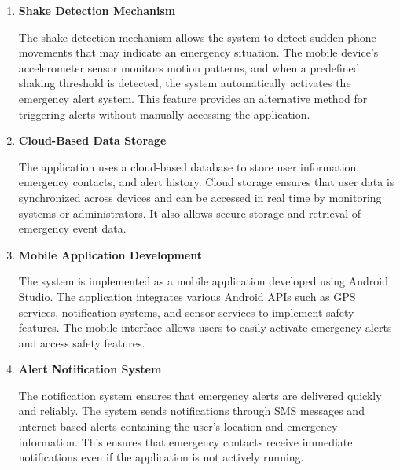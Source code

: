 \documentclass[a4paper,12pt]{report}
\begin{document}
\begin{enumerate}
The system allows users to store and manage emergency contact details within the application. Users can add, update, or remove trusted contacts who will receive emergency alerts. When an SOS alert is triggered, the system automatically sends notifications to all registered contacts. This feature ensures that multiple people are informed during emergencies.


\item \textbf{Shake Detection Mechanism}

The shake detection mechanism allows the system to detect sudden phone movements that may indicate an emergency situation. The mobile device’s accelerometer sensor monitors motion patterns, and when a predefined shaking threshold is detected, the system automatically activates the emergency alert system. This feature provides an alternative method for triggering alerts without manually accessing the application.


\item \textbf{Cloud-Based Data Storage}

The application uses a cloud-based database to store user information, emergency contacts, and alert history. Cloud storage ensures that user data is synchronized across devices and can be accessed in real time by monitoring systems or administrators. It also allows secure storage and retrieval of emergency event data.


\item \textbf{Mobile Application Development}

The system is implemented as a mobile application developed using Android Studio. The application integrates various Android APIs such as GPS services, notification systems, and sensor services to implement safety features. The mobile interface allows users to easily activate emergency alerts and access safety features.


\item \textbf{Alert Notification System}

The notification system ensures that emergency alerts are delivered quickly and reliably. The system sends notifications through SMS messages and internet-based alerts containing the user’s location and emergency information. This ensures that emergency contacts receive immediate notifications even if the application is not actively running.

\end{enumerate}
\end{document}
